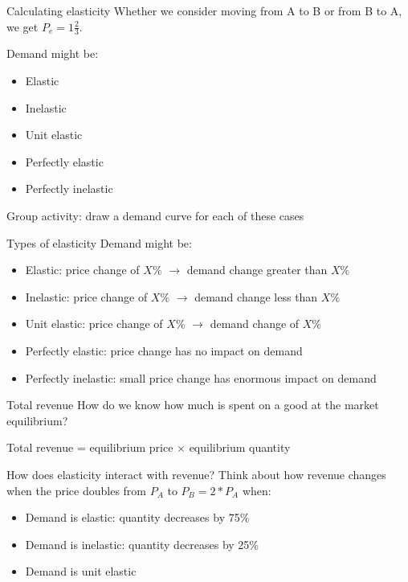 \documentclass[aspectratio=169]{beamer}
\begin{document}
\begin{frame}{Calculating elasticity}
   Whether we consider moving from A to B or from B to A, we get $P_e = 1 \frac{2}{3}$.

   \medskip

   Demand might be:
   \begin{itemize}
    \item Elastic
    \item Inelastic
    \item Unit elastic
    \item Perfectly elastic
    \item Perfectly inelastic
   \end{itemize}

   Group activity: draw a demand curve for each of these cases
\end{frame}

\begin{frame}{Types of elasticity}
    Demand might be:
    \begin{itemize}
     \item Elastic: price change of $X\%$ $\to$ demand change greater than $X\%$ 
     \item Inelastic: price change of $X\%$ $\to$ demand change less than $X\%$ 
     \item Unit elastic: price change of $X\%$ $\to$ demand change of $X\%$
     \item Perfectly elastic: price change has no impact on demand
     \item Perfectly inelastic: small price change has enormous impact on demand
    \end{itemize}
 \end{frame}

 \begin{frame}{Total revenue}
    How do we know how much is spent on a good at the market equilibrium?

    \medskip

    Total revenue = equilibrium price $\times$ equilibrium quantity

    \medskip

    How does elasticity interact with revenue? Think about how revenue changes when the price doubles from $P_A$ to $P_B = 2*P_A$ when:
    \begin{itemize}
        \item Demand is elastic: quantity decreases by 75\%
        \item Demand is inelastic: quantity decreases by 25\%
        \item Demand is unit elastic
    \end{itemize}

 \end{frame}
\end{document}
